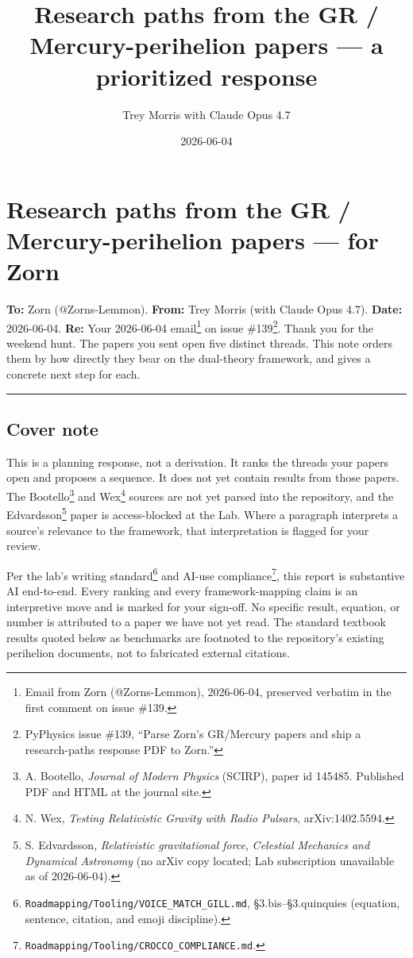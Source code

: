 \documentclass[
  11pt,
]{article}
\title{Research paths from the GR / Mercury-perihelion papers --- a
prioritized response}
\author{Trey Morris with Claude Opus 4.7}
\date{2026-06-04}
\begin{document}
\maketitle

\hypertarget{research-paths-from-the-gr-mercury-perihelion-papers-for-zorn}{%
\section{Research paths from the GR / Mercury-perihelion papers --- for
Zorn}\label{research-paths-from-the-gr-mercury-perihelion-papers-for-zorn}}

\textbf{To:} Zorn (@Zorns-Lemmon). \textbf{From:} Trey Morris (with
Claude Opus 4.7). \textbf{Date:} 2026-06-04. \textbf{Re:} Your
2026-06-04 email\footnote{Email from Zorn (@Zorns-Lemmon), 2026-06-04,
  preserved verbatim in the first comment on issue \#139.} on issue
\#139\footnote{PyPhysics issue \#139, ``Parse Zorn's GR/Mercury papers
  and ship a research-paths response PDF to Zorn.''}. Thank you for the
weekend hunt. The papers you sent open five distinct threads. This note
orders them by how directly they bear on the dual-theory framework, and
gives a concrete next step for each.

\begin{center}\rule{0.5\linewidth}{0.5pt}\end{center}

\hypertarget{cover-note}{%
\subsection{Cover note}\label{cover-note}}

This is a planning response, not a derivation. It ranks the threads your
papers open and proposes a sequence. It does not yet contain results
from those papers. The Bootello\footnote{A. Bootello, \emph{Journal of
  Modern Physics} (SCIRP), paper id 145485. Published PDF and HTML at
  the journal site.} and Wex\footnote{N. Wex, \emph{Testing Relativistic
  Gravity with Radio Pulsars}, arXiv:1402.5594.} sources are not yet
parsed into the repository, and the Edvardsson\footnote{S. Edvardsson,
  \emph{Relativistic gravitational force}, \emph{Celestial Mechanics and
  Dynamical Astronomy} (no arXiv copy located; Lab subscription
  unavailable as of 2026-06-04).} paper is access-blocked at the Lab.
Where a paragraph interprets a source's relevance to the framework, that
interpretation is flagged for your review.

Per the lab's writing standard\footnote{\texttt{Roadmapping/Tooling/VOICE\_MATCH\_GILL.md},
  §3.bis--§3.quinquies (equation, sentence, citation, and emoji
  discipline).} and AI-use compliance\footnote{\texttt{Roadmapping/Tooling/CROCCO\_COMPLIANCE.md}.},
this report is substantive AI end-to-end. Every ranking and every
framework-mapping claim is an interpretive move and is marked for your
sign-off. No specific result, equation, or number is attributed to a
paper we have not yet read. The standard textbook results quoted below
as benchmarks are footnoted to the repository's existing perihelion
documents, not to fabricated external citations.
\end{document}
